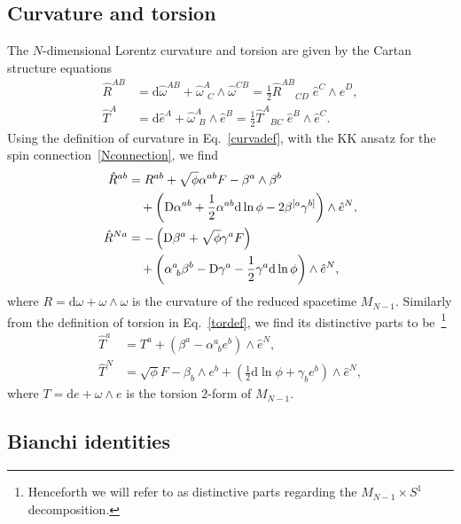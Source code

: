 \documentclass[aps,prd,12pt,superscriptaddress,showpacs,showkeys,longbibliography,reprint,nofootinbib]{revtex4-1}
\begin{document}
\subsection{Curvature and torsion}

The $N$-dimensional Lorentz curvature and torsion are given by the Cartan structure equations
\begin{align}
  \label{curvadef}
  \hat{R}^{AB} &= \mbox{d}\hat{\omega}^{AB}+\hat{\omega}^A_{\ \ C}\wedge\hat{\omega}^{CB} = \frac{1}{2} \hat{R}^{AB}{}_{CD} \; \hat{e}^C \wedge \hat{e}^D,\\
  \label{tordef}
  \hat{T}^A &= \mbox{d}\hat{e}^A+\hat{\omega}^A_{\ \ B}\wedge\hat{e}^B = \frac{1}{2} \hat{T}^{A}{}_{BC} \; \hat{e}^B \wedge \hat{e}^C. 
\end{align}
Using the definition of curvature in Eq.~\eqref{curvadef},  with the KK ansatz for the spin connection~\eqref{Nconnection}, we find
\begin{align}
  \label{R1}
  \hat{R}^{ab}&=R^{ab}+\sqrt{\phi}\alpha^{ab}F-\beta^a\wedge\beta^b\notag\\
  & \quad +\left(\mbox{D}\alpha^{ab}+\frac{1}{2}\alpha^{ab}\mbox{d}\ln\phi-2\beta^{[a}\gamma^{b]}\right)\wedge\hat{e}^N,\\
  \label{R2}
  \hat{R}^{Na}&=-\left(\mbox{D}\beta^a+\sqrt{\phi}\gamma^a F\right)\notag\\
  & \quad +\left(\alpha^a_{\ b}\beta^b-\mbox{D}\gamma^a-\frac{1}{2}\gamma^a\mbox{d}\ln\phi\right)\wedge\hat{e}^N,
\end{align}
where $R=\text{d}\omega+\omega\wedge\omega$ is the curvature of the reduced spacetime $M_{N-1}$. Similarly from the definition of torsion in Eq.~\eqref{tordef}, we find its distinctive parts to be~\footnote{Henceforth we will refer to as distinctive parts regarding the $M_{N-1}\times S^1$ decomposition.}
\begin{align}\label{T1}
  \hat{T}^a &= T^a+\left(\beta^a-\alpha^a_{\ \ b}e^b\right)\wedge\hat{e}^N,\\
  \label{T2}
  \hat{T}^N &= \sqrt{\phi}F-\beta_b\wedge e^b+\left(\frac{1}{2}\mbox{d}\ln\phi+\gamma_be^b\right)\wedge\hat{e}^N,
\end{align}
where $T=\text{d}e+\omega\wedge e$ is the torsion $2$-form of $M_{N-1}$.

\subsection{Bianchi identities\label{sec:bianchi}}
\end{document}

